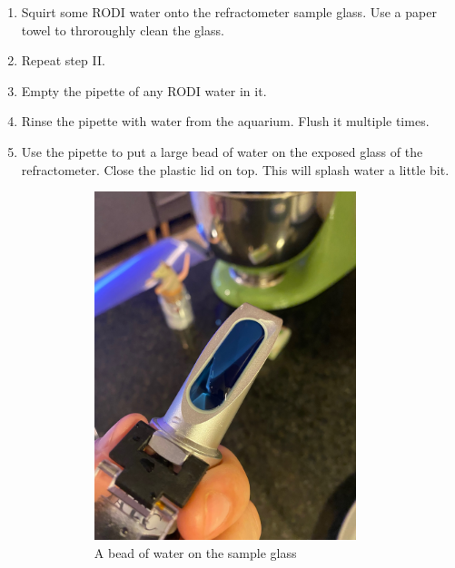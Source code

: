 \documentclass{report}
\begin{document}
\begin{enumerate}
\begin{enumerate}[I]
        \item Squirt some RODI water onto the refractometer sample glass. Use a paper towel to throroughly clean the glass.
        \item Repeat step II.
        \item Empty the pipette of any RODI water in it. 
        \item Rinse the pipette with water from the aquarium. Flush it multiple times.
        \item Use the pipette to put a large bead of water on the exposed glass of the refractometer. Close the plastic lid 
        on top. This will splash water a little bit. 
        \begin{figure}[H]
            \centering
            \begin{subfigure}{0.5\textwidth}
                \centering
                \includegraphics[width=0.9\textwidth, angle=-90]{OpenRefractometer.jpg}
                \caption{A bead of water on the sample glass}
            \end{subfigure}%
            \begin{subfigure}{0.5\textwidth}

\end{subfigure}
\end{figure}
\end{enumerate}
\end{enumerate}
\end{document}
